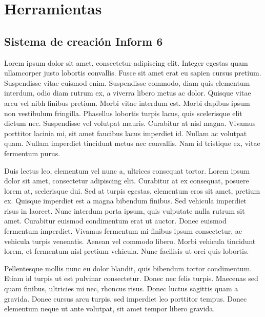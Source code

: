 
\chapter{Herramientas}\label{ch:herramientas}

\section{Sistema de creación Inform 6}

Lorem ipsum dolor sit amet\cite{Stanley:1970}, consectetur adipiscing elit. Integer egestas quam ullamcorper justo lobortis convallis. Fusce sit amet erat eu sapien cursus pretium. Suspendisse vitae euismod enim. Suspendisse commodo, diam quis elementum interdum, odio diam rutrum ex, a viverra libero metus ac dolor. Quisque vitae arcu vel nibh finibus pretium. Morbi vitae interdum est. Morbi dapibus ipsum non vestibulum fringilla. Phasellus lobortis turpis lacus, quis scelerisque elit dictum nec. Suspendisse vel volutpat mauris. Curabitur at nisl magna. Vivamus porttitor lacinia mi, sit amet faucibus lacus imperdiet id. Nullam ac volutpat quam. Nullam imperdiet tincidunt metus nec convallis. Nam id tristique ex, vitae fermentum purus.

Duis lectus leo, elementum vel nunc a, ultrices consequat tortor. Lorem ipsum dolor sit amet, consectetur adipiscing elit. Curabitur at ex consequat, posuere lorem at, scelerisque dui. Sed at turpis egestas, elementum eros sit amet, pretium ex. Quisque imperdiet est a magna bibendum finibus. Sed vehicula imperdiet risus in laoreet. Nunc interdum porta ipsum, quis vulputate nulla rutrum sit amet. Curabitur euismod condimentum erat ut auctor. Donec euismod fermentum imperdiet. Vivamus fermentum mi finibus ipsum consectetur, ac vehicula turpis venenatis. Aenean vel commodo libero. Morbi vehicula tincidunt lorem, et fermentum nisl pretium vehicula. Nunc facilisis ut orci quis lobortis.

Pellentesque mollis nunc eu dolor blandit, quis bibendum tortor condimentum. Etiam id turpis ut est pulvinar consectetur. Donec nec felis turpis. Maecenas sed quam finibus, ultricies mi nec, rhoncus risus. Donec luctus sagittis quam a gravida. Donec cursus arcu turpis, sed imperdiet leo porttitor tempus. Donec elementum neque ut ante volutpat, sit amet tempor libero gravida.


